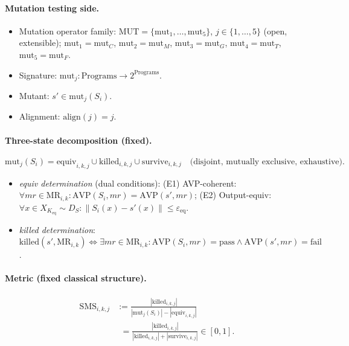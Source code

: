 \documentclass[review,12pt,authoryear]{elsarticle}
\begin{document}
\paragraph{Mutation testing side.}
\begin{itemize}
\item Mutation operator family: $\mathrm{MUT} = \{\mathrm{mut}_1, \ldots, \mathrm{mut}_5\}$, $j \in \{1,\ldots,5\}$ (open, extensible); $\mathrm{mut}_1 = \mathrm{mut}_C$, $\mathrm{mut}_2 = \mathrm{mut}_M$, $\mathrm{mut}_3 = \mathrm{mut}_G$, $\mathrm{mut}_4 = \mathrm{mut}_T$, $\mathrm{mut}_5 = \mathrm{mut}_F$.
\item Signature: $\mathrm{mut}_j : \text{Programs} \to 2^{\text{Programs}}$.
\item Mutant: $s' \in \mathrm{mut}_j(S_i)$.
\item Alignment: $\mathrm{align}(j) = j$.
\end{itemize}

\paragraph{Three-state decomposition (fixed).}
\[
\mathrm{mut}_j(S_i) = \mathrm{equiv}_{i,k,j} \cup \mathrm{killed}_{i,k,j} \cup \mathrm{survive}_{i,k,j} \quad \text{(disjoint, mutually exclusive, exhaustive)}.
\]
\begin{itemize}
\item \emph{equiv determination} (dual conditions):
  (E1) AVP-coherent: $\forall \mathit{mr} \in \mathrm{MR}_{i,k}: \mathrm{AVP}(S_i, \mathit{mr}) = \mathrm{AVP}(s', \mathit{mr})$;
  (E2) Output-equiv: $\forall x \in X_{K_{\mathrm{eq}}} \sim D_S: \|S_i(x) - s'(x)\| \leq \varepsilon_{\mathrm{eq}}$.
\item \emph{killed determination}: $\mathrm{killed}(s', \mathrm{MR}_{i,k}) \Leftrightarrow \exists \mathit{mr} \in \mathrm{MR}_{i,k}: \mathrm{AVP}(S_i, \mathit{mr}) = \text{pass} \wedge \mathrm{AVP}(s', \mathit{mr}) = \text{fail}$.
\end{itemize}

\paragraph{Metric (fixed classical structure).}
\begin{align*}
\mathrm{SMS}_{i,k,j} &:= \frac{|\mathrm{killed}_{i,k,j}|}{|\mathrm{mut}_j(S_i)| - |\mathrm{equiv}_{i,k,j}|} \\
                    &\phantom{:}= \frac{|\mathrm{killed}_{i,k,j}|}{|\mathrm{killed}_{i,k,j}| + |\mathrm{survive}_{i,k,j}|} \in [0, 1].
\end{align*}
\end{document}
